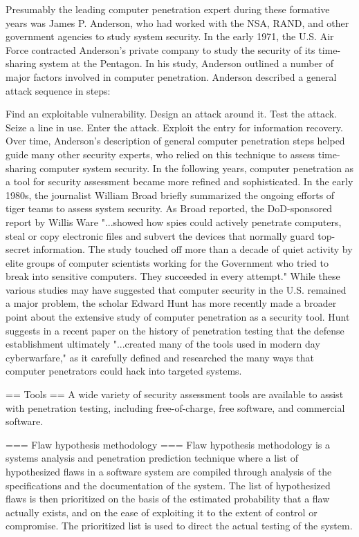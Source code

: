 Presumably the leading computer penetration expert during these formative years was James P. Anderson, who had worked with the NSA, RAND, and other government agencies to study system security. In the early 1971, the U.S. Air Force contracted Anderson's private company to study the security of its time-sharing system at the Pentagon. In his study, Anderson outlined a number of major factors involved in computer penetration. Anderson described a general attack sequence in steps:

Find an exploitable vulnerability.
Design an attack around it.
Test the attack.
Seize a line in use.
Enter the attack.
Exploit the entry for information recovery.
Over time, Anderson's description of general computer penetration steps helped guide many other security experts, who relied on this technique to assess time-sharing computer system security.
In the following years, computer penetration as a tool for security assessment became more refined and sophisticated. In the early 1980s, the journalist William Broad briefly summarized the ongoing efforts of tiger teams to assess system security. As Broad reported, the DoD-sponsored report by Willis Ware "...showed how spies could actively penetrate computers, steal or copy electronic files and subvert the devices that normally guard top-secret information. The study touched off more than a decade of quiet activity by elite groups of computer scientists working for the Government who tried to break into sensitive computers. They succeeded in every attempt."
While these various studies may have suggested that computer security in the U.S. remained a major problem, the scholar Edward Hunt has more recently made a broader point about the extensive study of computer penetration as a security tool. Hunt suggests in a recent paper on the history of penetration testing that the defense establishment ultimately "...created many of the tools used in modern day cyberwarfare," as it carefully defined and researched the many ways that computer penetrators could hack into targeted systems.


== Tools ==
A wide variety of security assessment tools are available to assist with penetration testing, including free-of-charge, free software, and commercial software. 


=== Flaw hypothesis methodology ===
Flaw hypothesis methodology is a systems analysis and penetration prediction technique where a list of hypothesized flaws in a software system are compiled through analysis of the specifications and the documentation of the system. The list of hypothesized flaws is then prioritized on the basis of the estimated probability that a flaw actually exists, and on the ease of exploiting it to the extent of control or compromise. The prioritized list is used to direct the actual testing of the system.


